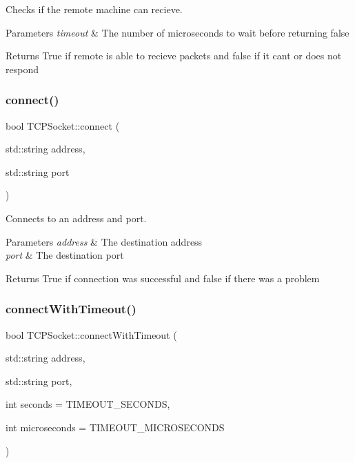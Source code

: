 Checks if the remote machine can recieve. 


\begin{DoxyParams}{Parameters}
{\em timeout} & The number of microseconds to wait before returning false \\
\hline
\end{DoxyParams}
\begin{DoxyReturn}{Returns}
True if remote is able to recieve packets and false if it can\textquotesingle{}t or does not respond 
\end{DoxyReturn}
\mbox{\label{classTCPSocket_a2e2e99f5b7cba6325c48424c992be5b5}} 
\subsubsection{\texorpdfstring{connect()}{connect()}}
{\footnotesize\ttfamily bool T\+C\+P\+Socket\+::connect (\begin{DoxyParamCaption}\item[{std\+::string}]{address,  }\item[{std\+::string}]{port }\end{DoxyParamCaption})}



Connects to an address and port. 


\begin{DoxyParams}{Parameters}
{\em address} & The destination address \\
\hline
{\em port} & The destination port \\
\hline
\end{DoxyParams}
\begin{DoxyReturn}{Returns}
True if connection was successful and false if there was a problem 
\end{DoxyReturn}
\mbox{\label{classTCPSocket_aeeea269d2c0339e19f92109b1d1b1c32}} 
\subsubsection{\texorpdfstring{connect\+With\+Timeout()}{connectWithTimeout()}}
{\footnotesize\ttfamily bool T\+C\+P\+Socket\+::connect\+With\+Timeout (\begin{DoxyParamCaption}\item[{std\+::string}]{address,  }\item[{std\+::string}]{port,  }\item[{int}]{seconds = {\ttfamily TIMEOUT\+\_\+SECONDS},  }\item[{int}]{microseconds = {\ttfamily TIMEOUT\+\_\+MICROSECONDS} }\end{DoxyParamCaption})}




